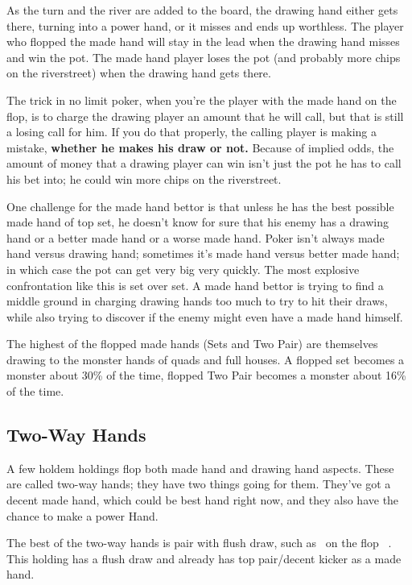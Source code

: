 
As the turn and the river are added to the board, the drawing hand
either gets there, turning into a power hand, or it misses and ends up
worthless. The player who flopped the made hand will stay in the lead
when the drawing hand misses and win the pot. The made hand player
loses the pot (and probably more chips on the riverstreet)
when the drawing hand gets there.

The trick in no limit poker, when you're the player with the made hand
on the flop, is to charge the drawing player an amount that he will
call, but that is still a losing call for him. If
you do that properly, the calling player is making a mistake,
\textbf{whether he makes his draw or not.} Because of implied odds,
the amount of money that a drawing player can win isn't just the pot
he has to call his bet into; he could win more chips on the
riverstreet.

One challenge for the made hand bettor is that unless he has the best
possible made hand of top set, he doesn't know for sure that his
enemy has a drawing hand or a better made hand or a worse made
hand. Poker isn't always made hand versus drawing hand; sometimes it's
made hand versus better made hand; in which case the pot can get very
big very quickly. The most explosive confrontation like this is set
over set. A made hand bettor is trying to find a middle ground in
charging drawing hands too much to try to hit their draws, while also
trying to discover if the enemy might even have a made hand himself.

The highest of the flopped made hands (Sets and Two Pair) are themselves
drawing to the monster hands of quads and full houses. A flopped set
becomes a monster about 30\% of the time, flopped Two Pair becomes a
monster about 16\% of the time.

\subsection{Two-Way Hands}

A few holdem holdings flop both made hand and drawing hand aspects.
These are called two-way hands; they have two things going for them.
They've got a decent made hand, which could be best hand right now,
and they also have the chance to make a power Hand.

The best of the two-way hands is pair with flush draw, such as
\Kd\tend\ on the flop \Kc\nined\eigd\ . This holding has a flush
draw and already has top pair/decent kicker as a made hand.

